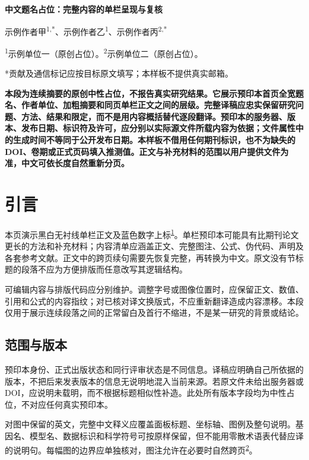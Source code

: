 \documentclass[UTF8,fontset=none,scheme=plain]{ctexart}
\renewcommand{\normalsize}{\fontsize{9.5bp}{13.5bp}\selectfont}
\newcommand{\PreprintCite}[1]{\textsuperscript{\hyperlink{preprint-ref:#1}{#1}}}
\begin{document}
\normalsize
{\bfseries\fontsize{20bp}{25bp}\selectfont 中文题名占位：完整内容的单栏呈现与复核\par}
\vspace{4bp}
示例作者甲\textsuperscript{1,*}、示例作者乙\textsuperscript{1}、示例作者丙\textsuperscript{2,*}\par
{\fontsize{8.5bp}{11.5bp}\selectfont
\textsuperscript{1}示例单位一（原创占位）。\quad\textsuperscript{2}示例单位二（原创占位）。\par
*贡献及通信标记应按目标原文填写；本样板不提供真实邮箱。\par}
\vspace{13bp}
{\bfseries
本段为连续摘要的原创中性占位，不报告真实研究结果。它展示预印本首页全宽题名、作者单位、加粗摘要和同页单栏正文之间的层级。完整译稿应忠实保留研究问题、方法、结果和限定，而不是用内容概括替代逐段翻译。预印本的服务器、版本、发布日期、标识符及许可，应分别以实际源文件所载内容为依据；文件属性中的生成时间不等同于公开发布日期。本样板不借用任何期刊标识，也不为缺失的 DOI、卷期或正式页码填入推测值。正文与补充材料的范围以用户提供文件为准，中文可依长度自然重新分页。\par}
\vspace{9bp}
\section*{引言}
本页演示黑白无衬线单栏正文及蓝色数字上标\PreprintCite{1}。单栏预印本可能具有比期刊论文更长的方法和补充材料；内容清单应涵盖正文、完整图注、公式、伪代码、声明及各套参考文献。正文中的跨页续句需要先恢复完整，再转换为中文。原文没有节标题的段落不应为方便排版而任意改写其逻辑结构。

可编辑内容与排版代码应分别维护。调整字号或图像位置时，应保留正文、数值、引用和公式的内容指纹；对已核对译文换版式，不应重新翻译造成内容漂移。本段仅用于展示连续段落之间的正常留白及首行不缩进，不是某一研究的背景或结论。

\subsection*{范围与版本}
预印本身份、正式出版状态和同行评审状态是不同信息。译稿应明确自己所依据的版本，不把后来发表版本的信息无说明地混入当前来源。若原文件未给出服务器或 DOI，应说明未载明，而不根据标题相似性补造。此处所有版本字段均为中性占位，不对应任何真实预印本。

对图中保留的英文，完整中文释义应覆盖面板标题、坐标轴、图例及整句说明。基因名、模型名、数据标识和科学符号可按原样保留，但不能用零散术语表代替应译的说明句。每幅图的边界应单独核对，图注允许在必要时自然跨页\PreprintCite{2}。
\end{document}
